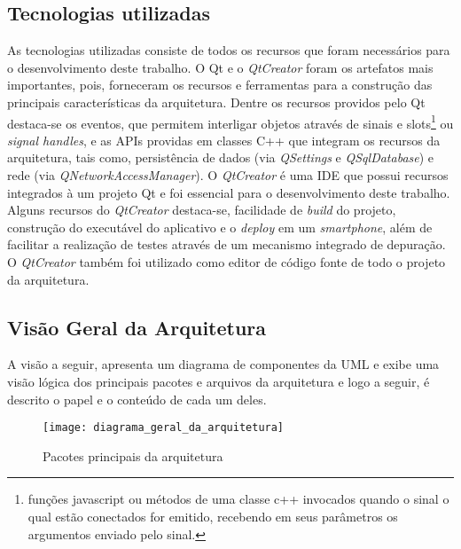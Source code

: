 \subsection{Tecnologias utilizadas}
As tecnologias utilizadas consiste de todos os recursos que foram necessários para o desenvolvimento deste trabalho. O Qt e o \textit{QtCreator} foram os artefatos mais importantes, pois, forneceram os recursos e ferramentas para a construção das principais características da arquitetura. Dentre os recursos providos pelo Qt destaca-se os eventos, que permitem interligar objetos através de sinais e slots\footnote{funções javascript ou métodos de uma classe c++ invocados quando o sinal o qual estão conectados for emitido, recebendo em seus parâmetros os argumentos enviado pelo sinal.} ou \textit{signal handles}, e as APIs providas em classes C++ que integram os recursos da arquitetura, tais como, persistência de dados (via \textit{QSettings} e \textit{QSqlDatabase}) e rede (via \textit{QNetworkAccessManager}). O \textit{QtCreator} é uma IDE que possui recursos integrados à um projeto Qt e foi essencial para o desenvolvimento deste trabalho. Alguns recursos do \textit{QtCreator} destaca-se, facilidade de \textit{build} do projeto, construção do executável do aplicativo e o \textit{deploy} em um \textit{smartphone}, além de facilitar a realização de testes através de um mecanismo integrado de depuração. O \textit{QtCreator} também foi utilizado como editor de código fonte de todo o projeto da arquitetura.


\subsection{Visão Geral da Arquitetura}
A visão a seguir, apresenta um diagrama de componentes da UML e exibe uma visão lógica dos principais pacotes e arquivos da arquitetura e logo a seguir, é descrito o papel e o conteúdo de cada um deles.

\begin{figure}[h]
	\texttt{[image: diagrama\_geral\_da\_arquitetura]}
	\centering
	\caption{Pacotes principais da arquitetura}
\end{figure}

